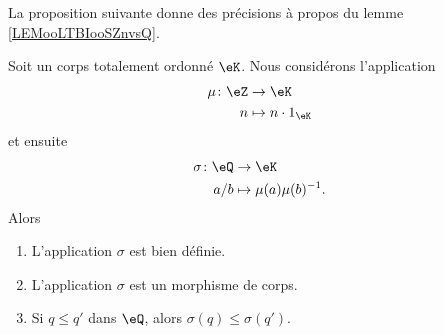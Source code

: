 La proposition suivante donne des précisions à propos du lemme \ref{LEMooLTBIooSZnvsQ}.

\begin{proposition}      \label{PROPooKNROooFdgIeQ}
    Soit un corps totalement ordonné \( \eK\). Nous considérons l'application
    \begin{equation}
        \begin{aligned}
            \mu\colon \eZ&\to \eK \\
            n&\mapsto n\cdot 1_{\eK} 
        \end{aligned}
    \end{equation}
    et ensuite
    \begin{equation}
        \begin{aligned}
            \sigma\colon \eQ&\to \eK \\
            a/b&\mapsto \mu(a)\mu(b)^{-1}. 
        \end{aligned}
    \end{equation}
    Alors
    \begin{enumerate}
        \item
            L'application \( \sigma\) est bien définie.
        \item
            L'application \( \sigma\) est un morphisme de corps.
        \item
            Si \( q\leq q'\) dans \( \eQ\), alors \( \sigma(q)\leq \sigma(q')\).
    \end{enumerate}
\end{proposition}

